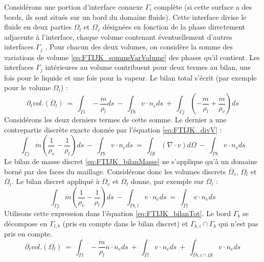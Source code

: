 Consid\'erons une portion d’interface connexe $\Gamma_{i}$ compl\`ete (si cette surface a des bords, ils sont situ\'es sur un bord du domaine fluide). Cette interface divise le fluide en deux parties $\Omega_{l}$ et $\Omega_{v}$ d\'esign\'ees en fonction de la phase directement adjacente à l’interface, chaque volume contenant \'eventuellement d’autres interfaces $\Gamma_{j}$ . Pour chacun des deux volumes, on consid\`ere la somme des variations de volume \ref{eq:FTIJK_sommeVarVolume} des phases qu’il contient. Les interfaces $\Gamma_{j}$ int\'erieures au volume contribuent pour deux termes au bilan, une fois pour le liquide et une fois pour la vapeur. Le bilan total s’\'ecrit (par exemple pour le volume $\Omega_{l}$) :
\begin{equation}
\partial_{t}vol.(\Omega_{l})\:=\:\int_{\Gamma i} - \dfrac{\dot{m}}{\rho_{l}} ds \:-\:\int_{\Gamma b} v \cdot n_{e}ds\:+\:\int_{\Gamma j} \left( -\dfrac{\dot{m}}{\rho_{l}}+\dfrac{\dot{m}}{\rho_{v}} \right) ds \label{eq:FTIJK_bilanTot}
\end{equation}
Consid\'erons les deux derniers termes de cette somme. Le dernier a une contrepartie discrète exacte donn\'ee par l’\'equation \ref{eq:FTIJK_divV} :
\begin{equation}
\int_{\Gamma j} \dot{m} \left( \dfrac{1}{\rho_{v}}-\dfrac{1}{\rho_{l}} \right) ds\:-\:\int_{\Gamma b} v \cdot n_{e}ds\:=\:\int_{\overline{\Omega}l} (\nabla \cdot v)d\Omega\:-\:\int_{\Gamma b} v \cdot n_{e}ds
\end{equation}
Le bilan de masse discret \ref{eq:FTIJK_bilanMasse} ne s’applique qu’\`a un domaine born\'e par des faces du maillage. Consid\'erons donc les volumes discrets $\overline{\Omega}_{v}$, $\overline{\Omega}_{l}$ et $\overline{\Omega}_{i}$. Le bilan discret appliqu\'e \`a $\overline{\Omega}_{v}$ et $\overline{\Omega}_{l}$ donne, par exemple sur $\overline{\Omega}_{l}$ :
\begin{equation}
\int_{\Gamma j} \dot{m} \left( \dfrac{1}{\rho_{v}}-\dfrac{1}{\rho_{l}} \right) ds\:-\:\int_{\Gamma b,l} v \cdot n_{e}ds\:=\:\int_{\overline{\Gamma l}} v \cdot n_{e}ds
\end{equation}
Utilisons cette expression dans l’\'equation \ref{eq:FTIJK_bilanTot}. Le bord $\Gamma_{b}$ se d\'ecompose en $\Gamma_{l,b}$ (pris en compte dans le bilan discret) et $\Gamma_{b,i} \cap \Gamma_{b}$ qui n’est pas pris en compte.
\begin{equation}
\partial_{t}vol.(\Omega_{l})\:=\:\int_{\Gamma i}-\dfrac{\dot{m}}{\rho_{l}}n\cdot n_{e}ds\:+\:\int_{\overline{\Gamma}l}v \cdot n_{e} ds\:+\:\int_{\Gamma b,i \cap \Omega l} v \cdot n_{e} ds
\end{equation}
